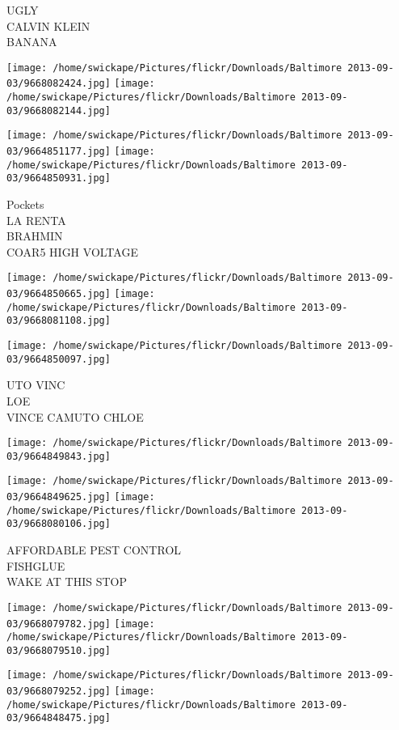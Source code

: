 \documentclass[10pt,letterpaper]{article}
\begin{document}
UGLY\\
CALVIN KLEIN\\
BANANA
\pagebreak

\texttt{[image: /home/swickape/Pictures/flickr/Downloads/Baltimore 2013-09-03/9668082424.jpg]}
\texttt{[image: /home/swickape/Pictures/flickr/Downloads/Baltimore 2013-09-03/9668082144.jpg]}

\texttt{[image: /home/swickape/Pictures/flickr/Downloads/Baltimore 2013-09-03/9664851177.jpg]}
\texttt{[image: /home/swickape/Pictures/flickr/Downloads/Baltimore 2013-09-03/9664850931.jpg]}

Pockets\\
LA RENTA\\
BRAHMIN\\
COAR5 HIGH VOLTAGE
\pagebreak

\texttt{[image: /home/swickape/Pictures/flickr/Downloads/Baltimore 2013-09-03/9664850665.jpg]}
\texttt{[image: /home/swickape/Pictures/flickr/Downloads/Baltimore 2013-09-03/9668081108.jpg]}

\texttt{[image: /home/swickape/Pictures/flickr/Downloads/Baltimore 2013-09-03/9664850097.jpg]}

UTO VINC\\
LOE\\
VINCE CAMUTO CHLOE
\pagebreak

\texttt{[image: /home/swickape/Pictures/flickr/Downloads/Baltimore 2013-09-03/9664849843.jpg]}

\vspace{0.25in}
\texttt{[image: /home/swickape/Pictures/flickr/Downloads/Baltimore 2013-09-03/9664849625.jpg]}
\texttt{[image: /home/swickape/Pictures/flickr/Downloads/Baltimore 2013-09-03/9668080106.jpg]}

AFFORDABLE PEST CONTROL\\
FISHGLUE\\
WAKE AT THIS STOP
\pagebreak

\texttt{[image: /home/swickape/Pictures/flickr/Downloads/Baltimore 2013-09-03/9668079782.jpg]}
\texttt{[image: /home/swickape/Pictures/flickr/Downloads/Baltimore 2013-09-03/9668079510.jpg]}

\texttt{[image: /home/swickape/Pictures/flickr/Downloads/Baltimore 2013-09-03/9668079252.jpg]}
\texttt{[image: /home/swickape/Pictures/flickr/Downloads/Baltimore 2013-09-03/9664848475.jpg]}
\end{document}
